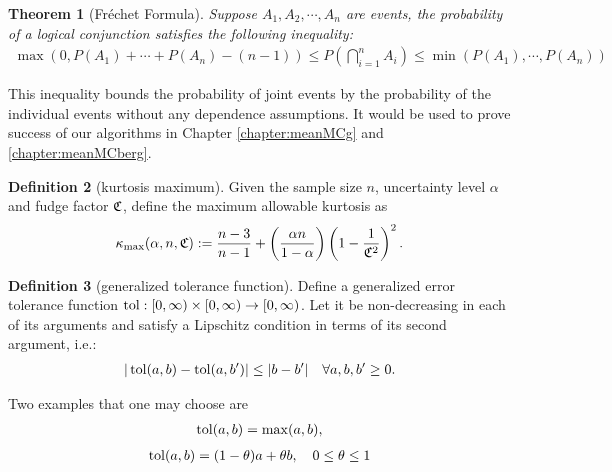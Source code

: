 \documentclass{iitthesis}
\newtheorem{theorem}{Theorem}[section]
\theoremstyle{definition}
\newtheorem{defn}[theorem]{Definition}
\begin{document}

\begin{theorem}[Fr\'{e}chet Formula] \cite{Frechet35}
Suppose $A_1, A_2,\cdots,A_n$ are events, the probability of a logical conjunction satisfies the following inequality:
\begin{multline}
 \max(0, P(A_1) + \cdots +P(A_n)-(n -1)) \leq P\left(\bigcap_{i=1}^n A_i\right) \leq \min(P(A_1),  \cdots, P(A_n))
\end{multline}
\end{theorem}
This inequality bounds the probability of joint events by the probability of the individual events without any dependence assumptions. It would be used to prove success of our algorithms in Chapter \ref{chapter:meanMCg} and \ref{chapter:meanMCberg}.


\begin{defn}[kurtosis maximum]
Given the sample size $n$, uncertainty level $\alpha$ and fudge factor $\mathfrak{C}$, define the maximum allowable kurtosis as
\begin{equation}
\label{def:kmax}
\kappa_{\max}(\alpha, n,\mathfrak{C}):= \frac{n-3}{n-1} + \left(\frac{ \alpha n}{1-\alpha}\right) \left(1 - \frac{1}{\mathfrak{C}^2}\right)^2.
\end{equation}
\end{defn}

\begin{defn}[generalized tolerance function]\label{def:tolfun}
 Define a generalized error tolerance function $\operatorname{tol}: [0, \infty) \times [0, \infty) \to [0,\infty)$. Let it be non-decreasing in each of its arguments and satisfy a Lipschitz condition in terms of its second argument, i.e.:
\begin{align*}
|\operatorname{tol}(a,b)-\operatorname{tol}(a,b')| \leq |b-b'| \quad \forall a,b,b' \geq 0.
\end{align*}
\end{defn}
Two examples that one may choose are
\begin{align*}
\operatorname{tol}(a,b) = \max (a,b),
\end{align*}
\begin{align*}
\operatorname{tol}(a,b) = (1- \theta) a + \theta b, \quad 0 \leq \theta \leq 1
\end{align*}
\end{document}
